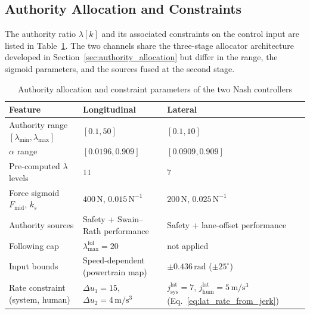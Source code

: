 \documentclass[12pt,a4paper,oneside]{report}
\begin{document}
\subsection{Authority Allocation and Constraints}

The authority ratio $\lambda[k]$ and its associated constraints on the control input are listed in Table~\ref{tab:comparison_authority}. The two channels share the three-stage allocator architecture developed in Section~\ref{sec:authority_allocation} but differ in the range, the sigmoid parameters, and the sources fused at the second stage.

\begin{table}[H]
\centering
\footnotesize
\setlength{\tabcolsep}{4pt}
\renewcommand{\arraystretch}{1.2}
\begin{tabularx}{\textwidth}{|l|X|X|}
\hline
\textbf{Feature} & \textbf{Longitudinal} & \textbf{Lateral} \\
\hline
Authority range $[\lambda_{\min}, \lambda_{\max}]$ & $[0.1, 50]$                             & $[0.1, 10]$                            \\
$\alpha$ range                               & $[0.0196, 0.909]$                               & $[0.0909, 0.909]$                      \\
Pre-computed $\lambda$ levels                & $11$                                            & $7$                                    \\
Force sigmoid $F_{\text{mid}}$, $k_s$        & $400\,\mathrm{N}$, $0.015\,\mathrm{N}^{-1}$     & $200\,\mathrm{N}$, $0.025\,\mathrm{N}^{-1}$ \\
Authority sources                            & Safety + Swain--Rath performance                & Safety + lane-offset performance       \\
Following cap                                & $\lambda_{\max}^{\text{fol}} = 20$              & not applied                            \\
Input bounds                                 & Speed-dependent (powertrain map)                & $\pm 0.436\,\mathrm{rad}$ ($\pm 25^\circ$) \\
Rate constraint (system, human)              & $\Delta u_1 = 15$, $\Delta u_2 = 4\,\mathrm{m/s^3}$ & $j^{\text{lat}}_{\text{sys}} = 7$, $j^{\text{lat}}_{\text{hum}} = 5\,\mathrm{m/s^3}$ (Eq.~\eqref{eq:lat_rate_from_jerk}) \\
\hline
\end{tabularx}
\caption{Authority allocation and constraint parameters of the two Nash controllers}
\label{tab:comparison_authority}
\end{table}
\end{document}
